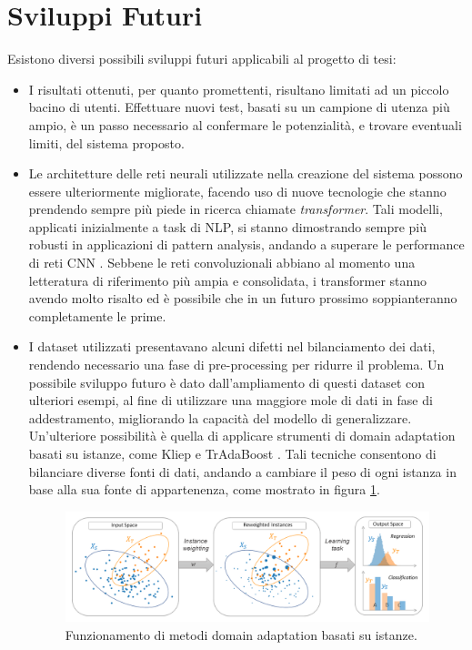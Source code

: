 \documentclass[11pt]{report}
\begin{document}
\section{Sviluppi Futuri}

Esistono diversi possibili sviluppi futuri applicabili al progetto di tesi:

\begin{itemize}
    \item I risultati ottenuti, per quanto promettenti, risultano limitati ad un piccolo bacino di utenti. Effettuare nuovi test, basati su un campione di utenza più ampio, è un passo necessario al confermare le potenzialità, e trovare eventuali limiti, del sistema proposto.
    
    \item Le architetture delle reti neurali utilizzate nella creazione del sistema possono essere ulteriormente migliorate, facendo uso di nuove tecnologie che stanno prendendo sempre più piede in ricerca chiamate \textit{transformer}. Tali modelli, applicati inizialmente a task di NLP, si stanno dimostrando sempre più robusti in applicazioni di pattern analysis, andando a superare le performance di reti CNN \cite{transformer}. Sebbene le reti convoluzionali abbiano al momento una letteratura di riferimento più ampia e consolidata, i transformer stanno avendo molto risalto ed è possibile che in un futuro prossimo soppianteranno completamente le prime.
    
    
    \item I dataset utilizzati presentavano alcuni difetti nel bilanciamento dei dati, rendendo necessario una fase di pre-processing per ridurre il problema. Un possibile sviluppo futuro è dato dall'ampliamento di questi dataset con ulteriori esempi, al fine di utilizzare una maggiore mole di dati in fase di addestramento, migliorando la capacità del modello di generalizzare. Un'ulteriore possibilità è quella di applicare strumenti di domain adaptation basati su istanze, come Kliep \cite{kliep} e TrAdaBoost \cite{tradaboost}. Tali tecniche consentono di bilanciare diverse fonti di dati, andando a cambiare il peso di ogni istanza in base alla sua fonte di appartenenza, come mostrato in figura \ref{fig-instance}.
    
    
    \begin{figure}[h]
\centering
\includegraphics[scale = 0.44]{img/instance_based.png}
\caption[Funzionamento di metodi domain adaptation basati su istanze.]{Funzionamento di metodi domain adaptation basati su istanze\footnotemark.}
\label{fig-instance}
\end{figure}


\end{itemize}
\end{document}
